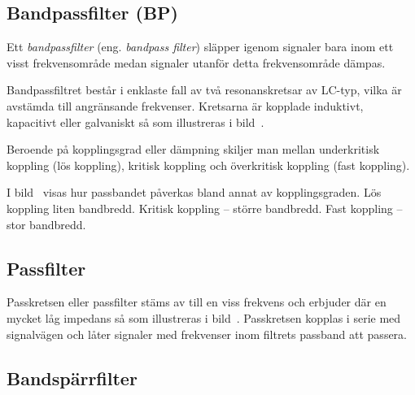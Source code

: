 \subsection{Bandpassfilter (BP)}


Ett \emph{bandpassfilter} (eng. \emph{bandpass filter}) släpper igenom signaler
bara inom ett visst frekvensområde medan signaler utanför detta frekvensområde dämpas.

Bandpassfiltret består i enklaste fall av två resonanskretsar av LC-typ, vilka
är avstämda till angränsande frekvenser.
Kretsarna är kopplade induktivt, kapacitivt eller galvaniskt så som illustreras
i bild~.

Beroende på kopplingsgrad eller dämpning skiljer man mellan underkritisk
koppling (lös koppling), kritisk koppling och överkritisk koppling
(fast koppling).

I bild~ visas hur passbandet påverkas bland annat av
kopplingsgraden.
Lös koppling liten bandbredd.
Kritisk koppling -- större bandbredd.
Fast koppling -- stor bandbredd.

\newpage

\subsection{Passfilter}

Passkretsen eller passfilter stäms av till en viss frekvens och erbjuder där
en mycket låg impedans så som illustreras i bild~.
Passkretsen kopplas i serie med signalvägen och låter signaler med
frekvenser inom filtrets passband att passera.


\subsection{Bandspärrfilter}

